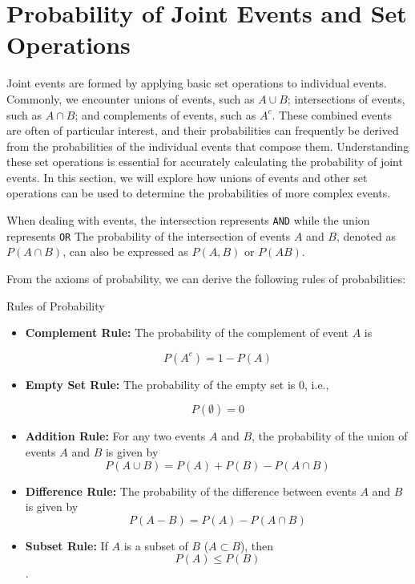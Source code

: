 \section{Probability of Joint Events and Set Operations}
Joint events are formed by applying basic set operations to individual events. Commonly, we encounter unions of events, such as $A \cup B$; intersections of events, such as $A \cap B$; and complements of events, such as $A^c$. These combined events are often of particular interest, and their probabilities can frequently be derived from the probabilities of the individual events that compose them. Understanding these set operations is essential for accurately calculating the probability of joint events. In this section, we will explore how unions of events and other set operations can be used to determine the probabilities of more complex events.

When dealing with events, the intersection represents \texttt{AND} while the union represents \texttt{OR} The probability of the intersection of events $A$ and $B$, denoted as $P(A \cap B)$, can also be expressed as $P(A, B)$ or $P(A B)$.

From the axioms of probability, we can derive the following rules of probabilities:

\begin{theorem}{Rules of Probability}
    \begin{itemize}
        \item \textbf{Complement Rule:} The probability of the complement of event $A$ is
    
        \[
        P(A^c) = 1 - P(A)
        \]

        \item \textbf{Empty Set Rule:} The probability of the empty set is 0, i.e.,
        
        \[P(\emptyset) = 0\]
        
        \item \textbf{Addition Rule:} For any two events $A$ and $B$, the probability of the union of events $A$ and $B$ is given by
        \[
        P(A \cup B) = P(A) + P(B) - P(A \cap B)
        \]

        \item \textbf{Difference Rule:} The probability of the difference between events $A$ and $B$ is given by
        \[
        P(A-B)=P(A)-P(A \cap B)
        \]
        \item \textbf{Subset Rule:} If $A$ is a subset of $B$ ($A \subset B$), then
        \[P(A) \leq P(B)\].
    \end{itemize}
\end{theorem}

